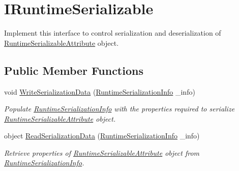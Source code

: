 \hypertarget{interface_voxel_busters_1_1_runtime_serialization_1_1_i_runtime_serializable}{}\section{I\+Runtime\+Serializable}
\label{interface_voxel_busters_1_1_runtime_serialization_1_1_i_runtime_serializable}


Implement this interface to control serialization and deserialization of \hyperlink{class_voxel_busters_1_1_runtime_serialization_1_1_runtime_serializable_attribute}{Runtime\+Serializable\+Attribute} object.  


\subsection*{Public Member Functions}
\begin{DoxyCompactItemize}
\item 
void \hyperlink{interface_voxel_busters_1_1_runtime_serialization_1_1_i_runtime_serializable_ad0d562a5e94e40838224b0a126f87c43}{Write\+Serialization\+Data} (\hyperlink{class_voxel_busters_1_1_runtime_serialization_1_1_runtime_serialization_info}{Runtime\+Serialization\+Info} \+\_\+info)
\begin{DoxyCompactList}\small\item\em Populate \hyperlink{class_voxel_busters_1_1_runtime_serialization_1_1_runtime_serialization_info}{Runtime\+Serialization\+Info} with the properties required to serialize \hyperlink{class_voxel_busters_1_1_runtime_serialization_1_1_runtime_serializable_attribute}{Runtime\+Serializable\+Attribute} object. \end{DoxyCompactList}\item 
object \hyperlink{interface_voxel_busters_1_1_runtime_serialization_1_1_i_runtime_serializable_aefabb56185a95845d52baf552879d6c5}{Read\+Serialization\+Data} (\hyperlink{class_voxel_busters_1_1_runtime_serialization_1_1_runtime_serialization_info}{Runtime\+Serialization\+Info} \+\_\+info)
\begin{DoxyCompactList}\small\item\em Retrieve properties of \hyperlink{class_voxel_busters_1_1_runtime_serialization_1_1_runtime_serializable_attribute}{Runtime\+Serializable\+Attribute} object from \hyperlink{class_voxel_busters_1_1_runtime_serialization_1_1_runtime_serialization_info}{Runtime\+Serialization\+Info}. \end{DoxyCompactList}\end{DoxyCompactItemize}


